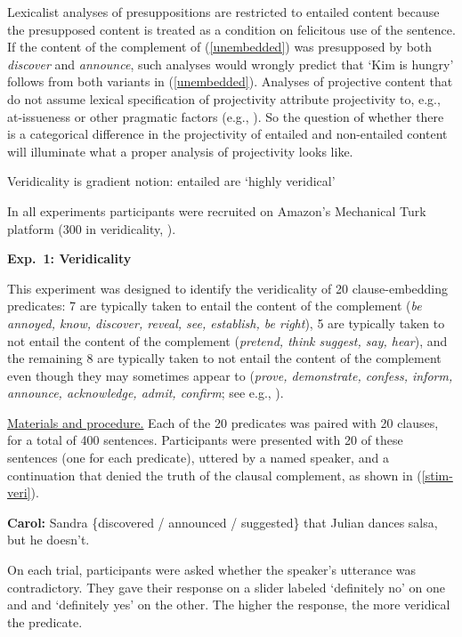 \documentclass[12pt]{article}
\newcommand{\6}{\mbox{$[\hspace*{-.6mm}[$}}
\newcommand{\9}{\mbox{$]\hspace*{-.6mm}]$}}
\begin{document}
Lexicalist analyses of presuppositions are restricted to entailed content because the presupposed content is treated as a condition on felicitous use of the sentence. If the content of the complement of (\ref{unembedded}) was presupposed by both {\em discover} and {\em announce}, such analyses would wrongly predict that `Kim is hungry' follows from both variants in (\ref{unembedded}). Analyses of projective content that do not assume lexical specification of projectivity attribute projectivity to, e.g., at-issueness or other pragmatic factors (e.g., \citealt{brst-salt10,brst-ar,abrusan2011,abrusan2013}). So the question of whether there is a categorical difference in the projectivity of entailed and non-entailed content will illuminate what a proper analysis of projectivity looks like.

Veridicality is gradient notion: entailed are `highly veridical'

In all experiments participants were recruited on Amazon's Mechanical Turk platform (300 in veridicality, ).

{\bf Exp.~1: Veridicality} 

This experiment was designed to identify the veridicality of 20 clause-embedding predicates: 7 are typically taken to entail the content of the complement ({\em be annoyed, know, discover, reveal, see, establish, be right}), 5 are typically taken to not entail the content of the complement ({\em pretend, think suggest, say, hear}), and the remaining 8 are typically taken to not entail the content of the complement even though they may sometimes appear to ({\em prove, demonstrate, confess, inform, announce, acknowledge, admit, confirm}; see e.g., \citealt{schlenker10,swanson2012,anand-hacquard2014}). 

\underline{Materials and procedure.} Each of the 20 predicates was paired with 20 clauses, for a total of 400 sentences. Participants were presented with 20 of these sentences (one for each predicate), uttered by a named speaker, and a continuation that denied the truth of the clausal complement, as shown in (\ref{stim-veri}).
\vspace*{-.2cm}
\begin{exe}
\ex\label{stim-veri} {\bf Carol:} Sandra \{discovered / announced / suggested\} that Julian dances salsa, but he doesn't. 
\end{exe}
\vspace*{-.2cm}
On each trial, participants were asked whether the speaker's utterance was contradictory. They gave their response on a slider labeled `definitely no' on one and and `definitely yes' on the other. The higher the response, the more veridical the predicate.
\end{document}
